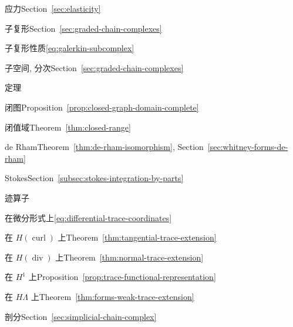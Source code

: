 \begin{theindex}
\item {}\label{index:stress}{应力}\quad Section~\ref{sec:elasticity}

\item {}\label{index:subcomplex}{子复形}\quad Section~\ref{sec:graded-chain-complexes}

\item {}\label{index:subcomplex-property}{子复形性质}\quad \eqref{eq:galerkin-subcomplex}

\item {}\label{index:subspace-graded}{子空间, 分次}\quad Section~\ref{sec:graded-chain-complexes}

\item {}\label{index:theorem}{定理}

\subitem {}\label{index:theorem-closed-graph}{闭图}\quad Proposition~\ref{prop:closed-graph-domain-complete}

\subitem {}\label{index:theorem-closed-range}{闭值域}\quad Theorem~\ref{thm:closed-range}

\subitem {}\label{index:theorem-de-rham}{de Rham}\quad Theorem~\ref{thm:de-rham-isomorphism}, Section~\ref{sec:whitney-forms-de-rham}

\subitem {}\label{index:theorem-stokes}{Stokes}\quad Section~\ref{subsec:stokes-integration-by-parts}

\item {}\label{index:trace-operator}{迹算子}

\subitem {}\label{index:trace-operator-on-differential-forms}{在微分形式上}\quad \eqref{eq:differential-trace-coordinates}

\subitem {}\label{index:trace-operator-on-h-operatorname-curl}{在 $H(\operatorname{curl})$ 上}\quad Theorem~\ref{thm:tangential-trace-extension}

\subitem {}\label{index:trace-operator-on-h-operatorname-div}{在 $H(\operatorname{div})$ 上}\quad Theorem~\ref{thm:normal-trace-extension}

\subitem {}\label{index:trace-operator-on-h-1}{在 $H^1$ 上}\quad Proposition~\ref{prop:trace-functional-representation}

\subitem {}\label{index:trace-operator-on-h-lambda}{在 $H\Lambda$ 上}\quad Theorem~\ref{thm:forms-weak-trace-extension}

\item {}\label{index:triangulation}{剖分}\quad Section~\ref{sec:simplicial-chain-complex}


\end{theindex}
